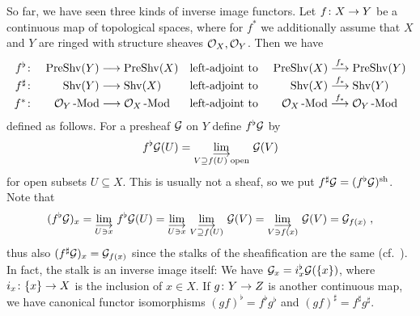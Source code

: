 \documentclass[a4paper,parskip=half,numbers=enddot, DIV=12]{scrreprt}
\begin{document}
\begin{rem}
	\begin{alphanumerate}
		\item{} So far, we have seen three kinds of inverse image functors. Let $f\colon X\morphism Y$ be a continuous map of topological spaces, where for $f^*$ we additionally assume that $X$ and $Y$ are ringed with structure sheaves $\mathcal{O}_X,\mathcal{O}_Y$. Then we have
		\begin{align*}
		\begin{array}{r c l c}
		f^\flat\colon & \cat{PreShv}(Y)\morphism[ ]\cat{PreShv}(X)&\text{left-adjoint to } & \cat{PreShv}(X)\morphism[f_*]\cat{PreShv}(Y)\\
		f^\sharp\colon & \cat{Shv}(Y)\morphism[ ]\cat{Shv}(X) & \text{left-adjoint to } & \cat{Shv}(X)\morphism[f_*]\cat{Shv}(Y)\\
		f^*\colon & \Oo_Y\cat{-Mod}\morphism[ ]\Oo_X\cat{-Mod} & \text{left-adjoint to } & \Oo_X\cat{-Mod}\morphism[f_*]\Oo_Y\cat{-Mod}
		\end{array}
		\end{align*}
		defined as follows. For a presheaf $\mathcal{G}$ on $Y$ define $f^\flat \mathcal{G}$ by 
		\begin{align*}
		f^\flat\Gg(U)=\colimit[V\supseteq f(U)\text{ open}]\Gg(V)
		\end{align*}
		for open subsets $U\subseteq X$. This is usually not a sheaf, so we put $f^\sharp\mathcal{G}=(f^\flat\mathcal{G})^{\mathrm{sh}}$. Note that
		\begin{align*}
		(f^\flat\Gg)_x=\colimit[U\ni x]f^\flat\Gg(U)=\colimit[U\ni x]\colimit[V\supseteq f(U)]\Gg(V)=\colimit[V\ni f(x)]\Gg(V)=\Gg_{f(x)}\;,
		\end{align*}
		thus also $(f^\sharp\mathcal{G})_x=\mathcal{G}_{f(x)}$ since the stalks of the sheafification are the same (cf.\ \cite[Proposition~1.2.1]{alggeo1}). In fact, the stalk is an inverse image itself: We have $\mathcal{G}_x=i_x^\flat\mathcal{G}(\{x\})$, where $i_x\colon\{x\}\morphism X$ is the inclusion of $x\in X$. If $g\colon Y\morphism Z$ is another continuous map, we have canonical functor isomorphisms $(gf)^\flat=f^\flat g^\flat$ and $(gf)^\sharp =f^\sharp g^\sharp$.
		

\end{alphanumerate}
\end{rem}
\end{document}
